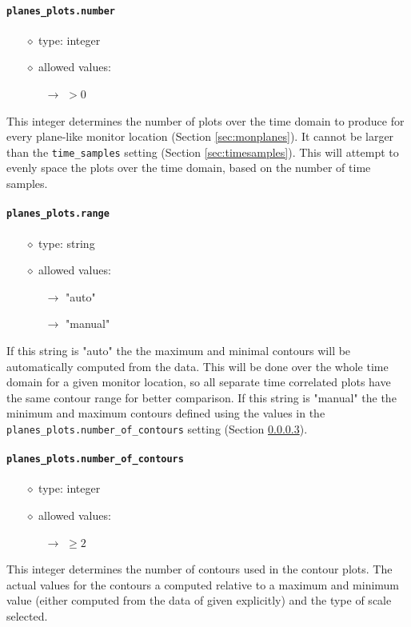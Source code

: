 \documentclass[]{article}
\def\code#1{\texttt{#1}}
\begin{document}
\paragraph{\code{planes\_plots.number}}
\begin{itemize}
    \item[$\diamond$] type: integer 
    \item[$\diamond$] allowed values:
    \begin{itemize}
        \item[$\rightarrow$] $>0$
    \end{itemize}
\end{itemize}
This integer determines the number of plots over the time domain to produce for
every plane-like monitor location (Section \ref{sec:monplanes}). It cannot be
larger than the \code{time\_samples} setting (Section \ref{sec:timesamples}).
This will attempt to evenly space the plots over the time domain, based on the
number of time samples.

\paragraph{\code{planes\_plots.range}}
\begin{itemize}
    \item[$\diamond$] type: string 
    \item[$\diamond$] allowed values:
    \begin{itemize}
        \item[$\rightarrow$] "auto"
        \item[$\rightarrow$] "manual"
    \end{itemize}
\end{itemize}
If this string is "auto" the the maximum and minimal contours will be
automatically computed from the data. This will be done over the whole time
domain for a given monitor location, so all separate time correlated plots have
the same contour range for better comparison. If this string is "manual" the the
minimum and maximum contours defined using the values in the
\code{planes\_plots.number\_of\_contours} setting
(Section \ref{sec:numcontour}).

\paragraph{\code{planes\_plots.number\_of\_contours}}\label{sec:numcontour}
\begin{itemize}
    \item[$\diamond$] type: integer 
    \item[$\diamond$] allowed values:
    \begin{itemize}
        \item[$\rightarrow$] $\geq2$
    \end{itemize}
\end{itemize}
This integer determines the number of contours used in the contour plots. The
actual values for the contours a computed relative to a maximum and minimum
value (either computed from the data of given explicitly) and the type of scale
selected.
\end{document}
